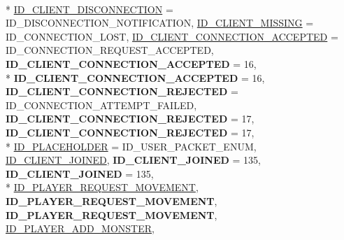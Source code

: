 \begin{DoxyCompactItemize}
\\*
\hyperlink{namespace_champ_net_plugin_a2ade5cfa7cf6c25ab7236c6b54a57821a2ed0fbbbbe782bca6c76277c89050ad9}{I\-D\-\_\-\-C\-L\-I\-E\-N\-T\-\_\-\-D\-I\-S\-C\-O\-N\-N\-E\-C\-T\-I\-O\-N} = I\-D\-\_\-\-D\-I\-S\-C\-O\-N\-N\-E\-C\-T\-I\-O\-N\-\_\-\-N\-O\-T\-I\-F\-I\-C\-A\-T\-I\-O\-N, 
\hyperlink{namespace_champ_net_plugin_a2ade5cfa7cf6c25ab7236c6b54a57821a31932f93b241ffddf903d32af0fc2155}{I\-D\-\_\-\-C\-L\-I\-E\-N\-T\-\_\-\-M\-I\-S\-S\-I\-N\-G} = I\-D\-\_\-\-C\-O\-N\-N\-E\-C\-T\-I\-O\-N\-\_\-\-L\-O\-S\-T, 
\hyperlink{namespace_champ_net_plugin_a2ade5cfa7cf6c25ab7236c6b54a57821a0295101371b4a70a1c007a4f6e206e1d}{I\-D\-\_\-\-C\-L\-I\-E\-N\-T\-\_\-\-C\-O\-N\-N\-E\-C\-T\-I\-O\-N\-\_\-\-A\-C\-C\-E\-P\-T\-E\-D} = I\-D\-\_\-\-C\-O\-N\-N\-E\-C\-T\-I\-O\-N\-\_\-\-R\-E\-Q\-U\-E\-S\-T\-\_\-\-A\-C\-C\-E\-P\-T\-E\-D, 
{\bfseries I\-D\-\_\-\-C\-L\-I\-E\-N\-T\-\_\-\-C\-O\-N\-N\-E\-C\-T\-I\-O\-N\-\_\-\-A\-C\-C\-E\-P\-T\-E\-D} = 16, 
\\*
{\bfseries I\-D\-\_\-\-C\-L\-I\-E\-N\-T\-\_\-\-C\-O\-N\-N\-E\-C\-T\-I\-O\-N\-\_\-\-A\-C\-C\-E\-P\-T\-E\-D} = 16, 
{\bfseries I\-D\-\_\-\-C\-L\-I\-E\-N\-T\-\_\-\-C\-O\-N\-N\-E\-C\-T\-I\-O\-N\-\_\-\-R\-E\-J\-E\-C\-T\-E\-D} = I\-D\-\_\-\-C\-O\-N\-N\-E\-C\-T\-I\-O\-N\-\_\-\-A\-T\-T\-E\-M\-P\-T\-\_\-\-F\-A\-I\-L\-E\-D, 
{\bfseries I\-D\-\_\-\-C\-L\-I\-E\-N\-T\-\_\-\-C\-O\-N\-N\-E\-C\-T\-I\-O\-N\-\_\-\-R\-E\-J\-E\-C\-T\-E\-D} = 17, 
{\bfseries I\-D\-\_\-\-C\-L\-I\-E\-N\-T\-\_\-\-C\-O\-N\-N\-E\-C\-T\-I\-O\-N\-\_\-\-R\-E\-J\-E\-C\-T\-E\-D} = 17, 
\\*
\hyperlink{namespace_champ_net_plugin_a2ade5cfa7cf6c25ab7236c6b54a57821a6acf78ef40fd50b2e823237ea828fc1b}{I\-D\-\_\-\-P\-L\-A\-C\-E\-H\-O\-L\-D\-E\-R} = I\-D\-\_\-\-U\-S\-E\-R\-\_\-\-P\-A\-C\-K\-E\-T\-\_\-\-E\-N\-U\-M, 
\hyperlink{namespace_champ_net_plugin_a2ade5cfa7cf6c25ab7236c6b54a57821aeb7ac0bb4cb955cc0b7a3bebc9f14774}{I\-D\-\_\-\-C\-L\-I\-E\-N\-T\-\_\-\-J\-O\-I\-N\-E\-D}, 
{\bfseries I\-D\-\_\-\-C\-L\-I\-E\-N\-T\-\_\-\-J\-O\-I\-N\-E\-D} = 135, 
{\bfseries I\-D\-\_\-\-C\-L\-I\-E\-N\-T\-\_\-\-J\-O\-I\-N\-E\-D} = 135, 
\\*
\hyperlink{namespace_champ_net_plugin_a2ade5cfa7cf6c25ab7236c6b54a57821abaa5b813ea0118cdccbb8f80d461fea8}{I\-D\-\_\-\-P\-L\-A\-Y\-E\-R\-\_\-\-R\-E\-Q\-U\-E\-S\-T\-\_\-\-M\-O\-V\-E\-M\-E\-N\-T}, 
{\bfseries I\-D\-\_\-\-P\-L\-A\-Y\-E\-R\-\_\-\-R\-E\-Q\-U\-E\-S\-T\-\_\-\-M\-O\-V\-E\-M\-E\-N\-T}, 
{\bfseries I\-D\-\_\-\-P\-L\-A\-Y\-E\-R\-\_\-\-R\-E\-Q\-U\-E\-S\-T\-\_\-\-M\-O\-V\-E\-M\-E\-N\-T}, 
\hyperlink{namespace_champ_net_plugin_a2ade5cfa7cf6c25ab7236c6b54a57821a942496ffc9e2a24c46c0bfd3f24460f6}{I\-D\-\_\-\-P\-L\-A\-Y\-E\-R\-\_\-\-A\-D\-D\-\_\-\-M\-O\-N\-S\-T\-E\-R}, 

\end{DoxyCompactItemize}
